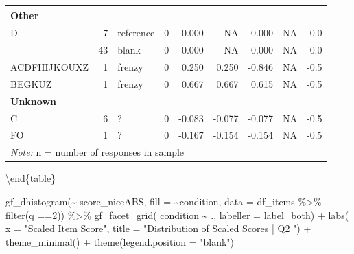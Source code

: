 \documentclass[
  letterpaper,
  DIV=11,
  numbers=noendperiod]{scrreprt}
\newenvironment{Shaded}{\begin{snugshade}}{\end{snugshade}}
\newcommand{\AttributeTok}[1]{\textcolor[rgb]{0.40,0.45,0.13}{#1}}
\newcommand{\DecValTok}[1]{\textcolor[rgb]{0.68,0.00,0.00}{#1}}
\newcommand{\FunctionTok}[1]{\textcolor[rgb]{0.28,0.35,0.67}{#1}}
\newcommand{\NormalTok}[1]{\textcolor[rgb]{0.00,0.23,0.31}{#1}}
\newcommand{\SpecialCharTok}[1]{\textcolor[rgb]{0.37,0.37,0.37}{#1}}
\newcommand{\StringTok}[1]{\textcolor[rgb]{0.13,0.47,0.30}{#1}}
\begin{document}
\begin{tabular}[t]{l|r|l|r|r|r|r|r|r}
\hline
\multicolumn{9}{l}{\textbf{Other}}\\
\hline
\hspace{1em}D & 7 & reference & 0 & 0.000 & NA & 0.000 & NA & 0.0\\
\hline
\hspace{1em} & 43 & blank & 0 & 0.000 & NA & 0.000 & NA & 0.0\\
\hline
\hspace{1em}ACDFHIJKOUXZ & 1 & frenzy & 0 & 0.250 & 0.250 & -0.846 & NA & -0.5\\
\hline
\hspace{1em}BEGKUZ & 1 & frenzy & 0 & 0.667 & 0.667 & 0.615 & NA & -0.5\\
\hline
\multicolumn{9}{l}{\textbf{Unknown}}\\
\hline
\hspace{1em}C & 6 & ? & 0 & -0.083 & -0.077 & -0.077 & NA & -0.5\\
\hline
\hspace{1em}FO & 1 & ? & 0 & -0.167 & -0.154 & -0.154 & NA & -0.5\\
\hline
\multicolumn{9}{l}{\rule{0pt}{1em}\textit{Note: } n = number of responses in sample}\\
\end{tabular}

\textbackslash end\{table\}

\begin{Shaded}
\begin{Highlighting}[]
\FunctionTok{gf\_dhistogram}\NormalTok{(}\SpecialCharTok{\textasciitilde{}}\NormalTok{ score\_niceABS, }\AttributeTok{fill =} \SpecialCharTok{\textasciitilde{}}\NormalTok{condition, }\AttributeTok{data =}\NormalTok{ df\_items }\SpecialCharTok{\%\textgreater{}\%} \FunctionTok{filter}\NormalTok{(q }\SpecialCharTok{==}\DecValTok{2}\NormalTok{)) }\SpecialCharTok{\%\textgreater{}\%} 
  \FunctionTok{gf\_facet\_grid}\NormalTok{( condition }\SpecialCharTok{\textasciitilde{}}\NormalTok{ ., }\AttributeTok{labeller =}\NormalTok{ label\_both) }\SpecialCharTok{+} 
  \FunctionTok{labs}\NormalTok{( }\AttributeTok{x =} \StringTok{"Scaled Item Score"}\NormalTok{, }\AttributeTok{title =} \StringTok{"Distribution of Scaled Scores | Q2 "}\NormalTok{) }\SpecialCharTok{+} 
  \FunctionTok{theme\_minimal}\NormalTok{() }\SpecialCharTok{+} \FunctionTok{theme}\NormalTok{(}\AttributeTok{legend.position =} \StringTok{"blank"}\NormalTok{)}
\end{Highlighting}
\end{Shaded}
\end{document}
